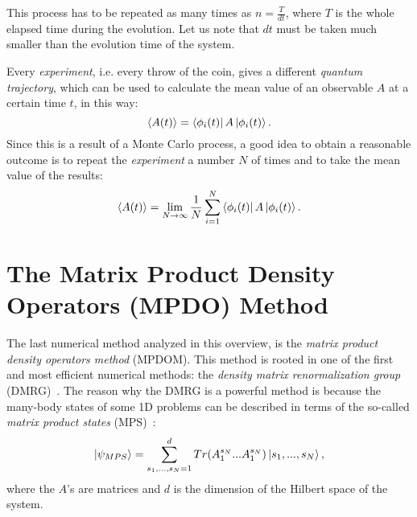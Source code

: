 This process has to be repeated as many times as $n = \frac{T}{dt}$, where $T$ is the whole elapsed time during the evolution. Let us note that $dt$ must be taken much smaller than the evolution time of the system.

Every \emph{experiment}, i.e. every throw of the coin, gives a different \emph{quantum trajectory}, which can be used to calculate the mean value of an observable $A$ at a certain time $t$, in this way:
\begin{equation}
    \langle A(t)\rangle = \bra{\phi_i(t)}A\ket{\phi_i(t)}.
\end{equation}
Since this is a result of a Monte Carlo process, a good idea to obtain a reasonable outcome is to repeat the \emph{experiment} a number $N$ of times and to take the mean value of the results:
\begin{equation}
    \langle A(t)\rangle = \lim_{N\to\infty} \frac{1}{N}\sum_{i=1}^{N}\bra{\phi_i(t)}A\ket{\phi_i(t)}.
\end{equation}


\section{The Matrix Product Density Operators (MPDO) Method}
The last numerical method analyzed in this overview, is the \emph{matrix product density operators method} (MPDOM).
This method is rooted in one of the first and most efficient numerical methods: the \emph{density matrix renormalization group} (DMRG)~\cite{s_white:dmrg}. The reason why the DMRG is a powerful method is because the many-body states of some 1D problems can be described in terms of the so-called \emph{matrix product states} (MPS)~\cite{PhysRevLett.93.207204, PhysRevLett:from_dmrg_to_mps}:
\begin{equation}
    \ket{\psi_{MPS}} = \sum_{s_1, ..., s_N = 1}^{d} Tr(A_1^{s_N}...A_1^{s_N}) \ket{s_1,...,s_N},
\end{equation}
where the $A$'s are matrices and $d$ is the dimension of the Hilbert space of the system. 

